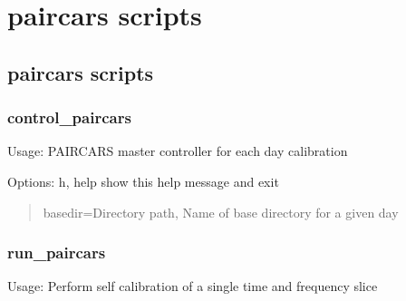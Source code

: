 \documentclass[letterpaper,10pt,english]{sphinxmanual}
\begin{document}
\chapter{paircars scripts}
\label{\detokenize{modules:paircars-scripts}}

\section{paircars scripts}
\label{\detokenize{scripts:paircars-scripts}}\label{\detokenize{scripts::doc}}

\subsection{control\_paircars}
\label{\detokenize{scripts:control-paircars}}
\sphinxAtStartPar
Usage:  PAIRCARS master controller for each day calibration

\sphinxAtStartPar
Options: \sphinxhyphen{}h, \sphinxhyphen{}\sphinxhyphen{}help                            show this help message and exit
\begin{quote}

\sphinxAtStartPar
\sphinxhyphen{}\sphinxhyphen{}basedir=Directory path,      Name of base directory for a given day
\end{quote}


\subsection{run\_paircars}
\label{\detokenize{scripts:run-paircars}}
\sphinxAtStartPar
Usage:  Perform self calibration of a single time and frequency slice
\end{document}
